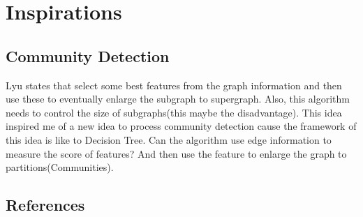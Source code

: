 \documentclass{article}
\begin{document}
	\section{Inspirations}
	\subsection{Community Detection}
	Lyu\cite{lyu2016scalable} states that select some best features from the graph information and then use these to eventually enlarge the subgraph to supergraph. 
	\newline
	Also, this algorithm needs to control the size of subgraphs(this maybe the disadvantage).
	\newline
	This idea inspired me of a new idea to process community detection cause the framework of this idea is like to Decision Tree. Can the algorithm use edge information to measure the score of features? And then use the feature to enlarge the graph to partitions(Communities).

	\begin{appendix}
		\section{References}
		
		
	\end{appendix}
\end{document}
